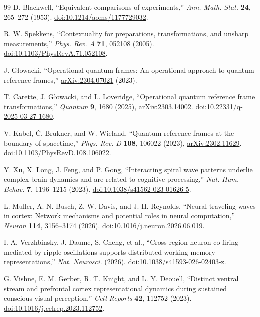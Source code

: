 \documentclass[11pt]{article}
\begin{document}
\begin{thebibliography}{99}
D. Blackwell,
``Equivalent comparisons of experiments,''
\emph{Ann. Math. Stat.} \textbf{24}, 265--272 (1953).
\href{https://doi.org/10.1214/aoms/1177729032}{doi:10.1214/aoms/1177729032}.

R. W. Spekkens,
``Contextuality for preparations, transformations, and unsharp measurements,''
\emph{Phys. Rev. A} \textbf{71}, 052108 (2005).
\href{https://doi.org/10.1103/PhysRevA.71.052108}{doi:10.1103/PhysRevA.71.052108}.

J. G\l{}owacki,
``Operational quantum frames: An operational approach to quantum reference frames,''
\href{https://arxiv.org/abs/2304.07021}{arXiv:2304.07021} (2023).

T. Carette, J. G\l{}owacki, and L. Loveridge,
``Operational quantum reference frame transformations,''
\emph{Quantum} \textbf{9}, 1680 (2025),
\href{https://arxiv.org/abs/2303.14002}{arXiv:2303.14002}.
\href{https://doi.org/10.22331/q-2025-03-27-1680}{doi:10.22331/q-2025-03-27-1680}.

V. Kabel, \v{C}. Brukner, and W. Wieland,
``Quantum reference frames at the boundary of spacetime,''
\emph{Phys. Rev. D} \textbf{108}, 106022 (2023),
\href{https://arxiv.org/abs/2302.11629}{arXiv:2302.11629}.
\href{https://doi.org/10.1103/PhysRevD.108.106022}{doi:10.1103/PhysRevD.108.106022}.

Y. Xu, X. Long, J. Feng, and P. Gong,
``Interacting spiral wave patterns underlie complex brain dynamics and are related to cognitive processing,''
\emph{Nat. Hum. Behav.} \textbf{7}, 1196--1215 (2023).
\href{https://doi.org/10.1038/s41562-023-01626-5}{doi:10.1038/s41562-023-01626-5}.

L. Muller, A. N. Busch, Z. W. Davis, and J. H. Reynolds,
``Neural traveling waves in cortex: Network mechanisms and potential roles in neural computation,''
\emph{Neuron} \textbf{114}, 3156--3174 (2026).
\href{https://doi.org/10.1016/j.neuron.2026.06.019}{doi:10.1016/j.neuron.2026.06.019}.

I. A. Verzhbinsky, J. Daume, S. Cheng, et al.,
``Cross-region neuron co-firing mediated by ripple oscillations supports distributed working memory representations,''
\emph{Nat. Neurosci.} (2026).
\href{https://doi.org/10.1038/s41593-026-02403-z}{doi:10.1038/s41593-026-02403-z}.

G. Vishne, E. M. Gerber, R. T. Knight, and L. Y. Deouell,
``Distinct ventral stream and prefrontal cortex representational dynamics during sustained conscious visual perception,''
\emph{Cell Reports} \textbf{42}, 112752 (2023).
\href{https://doi.org/10.1016/j.celrep.2023.112752}{doi:10.1016/j.celrep.2023.112752}.


\end{thebibliography}
\end{document}
